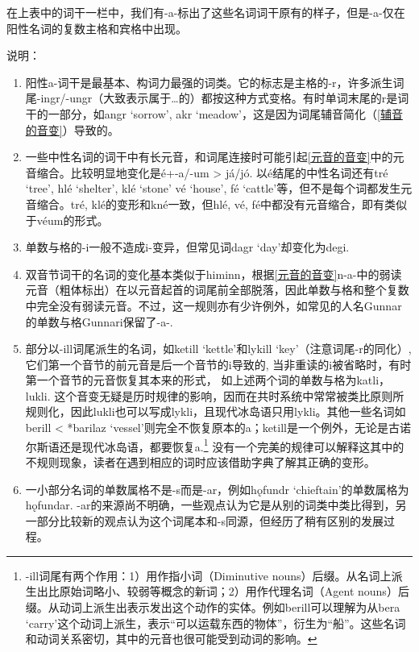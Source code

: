 在上表中的词干一栏中，我们有-a-标出了这些名词词干原有的样子，但是-a-仅在阳性名词的复数主格和宾格中出现。

说明：

\begin{enumerate}
  \def\labelenumi{\arabic{enumi})}
  \item
        阳性a-词干是最基本、构词力最强的词类。它的标志是主格的-r，许多派生词尾-ingr/-ungr（大致表示属于\ldots 的）都按这种方式变格。有时单词末尾的r是词干的一部分，如angr
        `sorrow', akr
        `meadow'，这是因为词尾辅音简化（\ref{辅音的音变}）导致的。
  \item
        一些中性名词的词干中有长元音，和词尾连接时可能引起\ref{元音的音变}中的元音缩合。比较明显地变化是é+-a/-um
        \textgreater{} já/jó. 以é结尾的中性名词还有tré `tree', hlé `shelter',
        klé `stone' vé `house', fé
        `cattle'等，但不是每个词都发生元音缩合。tré,
        klé的变形和kné一致，但hlé, vé,
        fé中都没有元音缩合，即有类似于véum的形式。
  \item
        单数与格的-i一般不造成i-变异，但常见词dagr `day'却变化为degi.
  \item
        双音节词干的名词的变化基本类似于himinn，根据\ref{元音的音变}n-a-中的弱读元音（粗体标出）在以元音起首的词尾前全部脱落，因此单数与格和整个复数中完全没有弱读元音。不过，这一规则亦有少许例外，如常见的人名Gunnar的单数与格Gunnari保留了-a-.
  \item
        部分以-ill词尾派生的名词，如ketill `kettle'和lykill
        `key'（注意词尾-r的同化）,
        它们第一个音节的前元音是后一个音节的i导致的,
        当非重读的i被省略时，有时第一个音节的元音恢复其本来的形式，
        如上述两个词的单数与格为katli，lukli.
        这个音变无疑是历时规律的影响，因而在共时系统中常常被类比原则所规则化，因此lukli也可以写成lykli，且现代冰岛语只用lykli。其他一些名词如berill
        \textless{} *barilaz
        `vessel'则完全不恢复原本的a；ketill是一个例外，无论是古诺尔斯语还是现代冰岛语，都要恢复a.\footnote{-ill词尾有两个作用：1）用作指小词（Diminutive
          nouns）后缀。从名词上派生出比原始词略小、较弱等概念的新词；2）用作代理名词（Agent
          nouns）后缀。从动词上派生出表示发出这个动作的实体。例如berill可以理解为从bera
          `carry'这个动词上派生，表示``可以运载东西的物体''，衍生为``船''。这些名词和动词关系密切，其中的元音也很可能受到动词的影响。}
        没有一个完美的规律可以解释这其中的不规则现象，读者在遇到相应的词时应该借助字典了解其正确的变形。
  \item
        一小部分名词的单数属格不是-s而是-ar，例如hǫfundr
        `chieftain'的单数属格为hǫfundar.
        -ar的来源尚不明确，一些观点认为它是从别的词类中类比得到，另一部分比较新的观点认为这个词尾本和-s同源，但经历了稍有区别的发展过程。
\end{enumerate}

